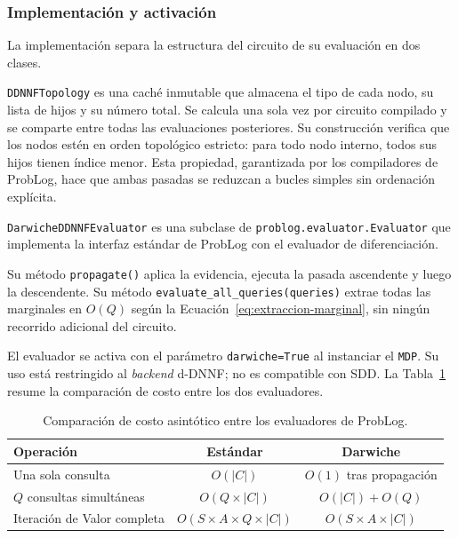 \clearpage

\subsubsection{Implementación y activación}
\label{sec:di-implementacion-darwiche}

La implementación separa la estructura del circuito de su evaluación en dos clases.

\texttt{DDNNFTopology} es una caché inmutable que almacena el tipo de cada nodo,
su lista de hijos y su número total. Se calcula una sola vez por circuito
compilado y se comparte entre todas las evaluaciones posteriores. Su construcción
verifica que los nodos estén en orden topológico estricto: para todo nodo interno,
todos sus hijos tienen índice menor. Esta propiedad, garantizada por los compiladores de ProbLog, hace que ambas
pasadas se reduzcan a bucles simples sin ordenación explícita.

\texttt{DarwicheDDNNFEvaluator} es una subclase de \texttt{problog.evaluator.Evaluator}
que implementa la interfaz estándar de ProbLog con el evaluador de diferenciación.
\begin{sloppypar}
Su método \texttt{propagate()} aplica la evidencia, ejecuta la pasada ascendente y
luego la descendente. Su método \texttt{evaluate\_all\_queries(queries)} extrae
todas las marginales en $O(Q)$ según la Ecuación~\ref{eq:extraccion-marginal},
sin ningún recorrido adicional del circuito.
\end{sloppypar}

El evaluador se activa con el parámetro \texttt{darwiche=True} al instanciar
el \texttt{MDP}. Su uso está restringido al \textit{backend} d-DNNF; no es
compatible con SDD. La Tabla~\ref{tab:costo-evaluadores} resume la comparación de
costo entre los dos evaluadores.

\begin{table}[ht]
\centering
\caption{Comparación de costo asintótico entre los evaluadores de ProbLog.}
\label{tab:costo-evaluadores}
\begin{tabular}{lcc}
\hline
\textbf{Operación} & \textbf{Estándar} & \textbf{Darwiche} \\
\hline
Una sola consulta & $O(|C|)$ & $O(1)$ tras propagación \\
$Q$ consultas simultáneas & $O(Q \times |C|)$ & $O(|C|) + O(Q)$ \\
Iteración de Valor completa & $O(S \times A \times Q \times |C|)$ & $O(S \times A \times |C|)$ \\
\hline
\end{tabular}
\end{table}

